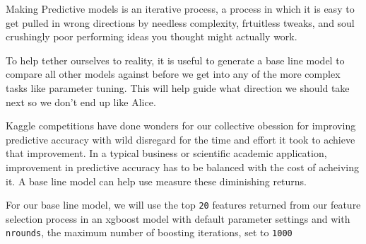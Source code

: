 \documentclass[]{book}
\newenvironment{Shaded}{\begin{snugshade}}{\end{snugshade}}
\newcommand{\KeywordTok}[1]{\textcolor[rgb]{0.13,0.29,0.53}{\textbf{#1}}}
\newcommand{\DataTypeTok}[1]{\textcolor[rgb]{0.13,0.29,0.53}{#1}}
\newcommand{\DecValTok}[1]{\textcolor[rgb]{0.00,0.00,0.81}{#1}}
\newcommand{\StringTok}[1]{\textcolor[rgb]{0.31,0.60,0.02}{#1}}
\newcommand{\OtherTok}[1]{\textcolor[rgb]{0.56,0.35,0.01}{#1}}
\newcommand{\OperatorTok}[1]{\textcolor[rgb]{0.81,0.36,0.00}{\textbf{#1}}}
\newcommand{\NormalTok}[1]{#1}
\theoremstyle{definition}
\theoremstyle{definition}
\theoremstyle{definition}
\theoremstyle{remark}
\begin{document}
Making Predictive models is an iterative process, a process in which it
is easy to get pulled in wrong directions by needless complexity,
frtuitless tweaks, and soul crushingly poor performing ideas you thought
might actually work.

To help tether ourselves to reality, it is useful to generate a base
line model to compare all other models against before we get into any of
the more complex tasks like parameter tuning. This will help guide what
direction we should take next so we don't end up like Alice.

Kaggle competitions have done wonders for our collective obession for
improving predictive accuracy with wild disregard for the time and
effort it took to achieve that improvement. In a typical business or
scientific academic application, improvement in predictive accuracy has
to be balanced with the cost of acheiving it. A base line model can help
use measure these diminishing returns.

For our base line model, we will use the top \texttt{20} features
returned from our feature selection process in an xgboost model with
default parameter settings and with \texttt{nrounds}, the maximum number
of boosting iterations, set to \texttt{1000}

\begin{Shaded}
\end{Shaded}
\end{document}
